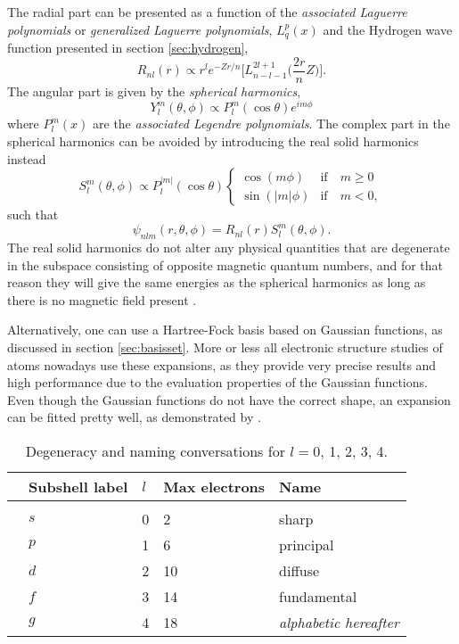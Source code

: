 The radial part can be presented as a function of the \textit{associated Laguerre polynomials} or \textit{generalized Laguerre polynomials}, $L_{q}^p(x)$ and the Hydrogen wave function presented in section \ref{sec:hydrogen},
\begin{equation}
R_{nl}(r)\propto r^le^{-Zr/n}\Big[L_{n-l-1}^{2l+1}\Big(\frac{2r}{n}Z\Big)\Big].
\end{equation}
The angular part is given by the \textit{spherical harmonics},
\begin{equation}
Y_l^m(\theta,\phi)\propto P_l^m(\cos\theta)e^{im\phi}
\end{equation}
where $P_l^m(x)$ are the \textit{associated Legendre polynomials}. The complex part in the spherical harmonics can be avoided by introducing the real solid harmonics instead
\begin{equation}
\label{eq:V_ext}
S_l^m(\theta,\phi)\propto P_l^{|m|}(\cos\theta)
\begin{cases} 
\cos(m\phi) & \text{if} \quad m\geq0 \\
\sin(|m|\phi) & \text{if} \quad m<0,
\end{cases}
\end{equation}
such that
\begin{equation}
\psi_{nlm}(r,\theta,\phi)= R_{nl}(r)S_l^m(\theta,\phi).
\label{eq:hydrogenlikesolid}
\end{equation}
The real solid harmonics do not alter any physical quantities that are degenerate in the subspace consisting of opposite magnetic quantum numbers, and for that reason they will give the same energies as the spherical harmonics as long as there is no magnetic field present \cite{morten_hjorth-jensen_computational_2019}.

Alternatively, one can use a Hartree-Fock basis based on Gaussian functions, as discussed in section \ref{sec:basisset}. More or less all electronic structure studies of atoms nowadays use these expansions, as they provide very precise results and high performance due to the evaluation properties of the Gaussian functions. Even though the Gaussian functions do not have the correct shape, an expansion can be fitted pretty well, as demonstrated by \citet{hehre_selfconsistent_1969}.

\begin{table}
	\caption{Degeneracy and naming conversations for $l=0$, 1, 2, 3, 4.  \vspace{2mm}}
	\begin{tabularx}{\textwidth}{R{0.3cm}XXXX} \hline\hline
		\label{tab:subshells}
		\makecell{\phantom{=}} & Subshell label & $l$ & Max electrons & Name \\ \hline \\
		& $s$ & 0 & 2 & sharp\\ 
		& $p$ & 1 & 6 & principal\\
		& $d$ & 2 & 10 & diffuse \\
		& $f$ & 3 & 14 & fundamental \\
		& $g$ & 4 & 18 & \textit{alphabetic hereafter} \\ \hline\hline
	\end{tabularx}
\end{table}

